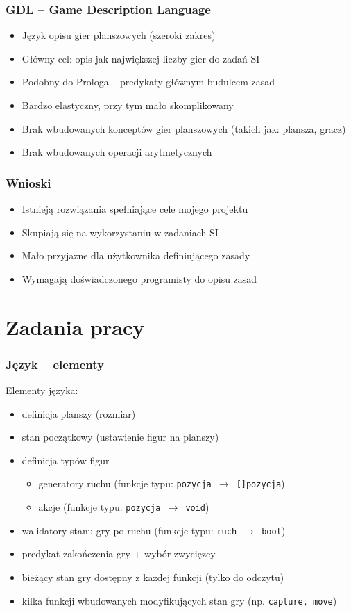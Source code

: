 \documentclass{beamer}
\begin{document}
\begin{frame}
	\frametitle{GDL -- Game Description Language\cite{GDL}}
	\begin{itemize}
		\item Język opisu gier planszowych (szeroki zakres)
		\item Główny cel: opis jak największej liczby gier do zadań SI
		\item Podobny do Prologa -- predykaty głównym budulcem zasad
		\item Bardzo elastyczny, przy tym mało skomplikowany
		\item Brak wbudowanych konceptów gier planszowych (takich jak: plansza, gracz)
		\item Brak wbudowanych operacji arytmetycznych
	\end{itemize}
\end{frame}

\begin{frame}
	\frametitle{Wnioski}
	\begin{itemize}
		\item Istnieją rozwiązania spełniające cele mojego projektu
		\item Skupiają się na wykorzystaniu w zadaniach SI
		\item Mało przyjazne dla użytkownika definiującego zasady
		\item Wymagają doświadczonego programisty do opisu zasad
	\end{itemize}
\end{frame}

\section{Zadania pracy}

\begin{frame}
	\frametitle{Język -- elementy}
	Elementy języka:
	\begin{itemize}
		\item definicja planszy (rozmiar)
		\item stan początkowy (ustawienie figur na planszy)
		\item definicja typów figur
		      \begin{itemize}
			      \item generatory ruchu (funkcje typu: {\tt pozycja $\rightarrow$ []pozycja})
			      \item akcje (funkcje typu: {\tt pozycja $\rightarrow$ void})
		      \end{itemize}
		\item walidatory stanu gry po ruchu (funkcje typu: {\tt ruch $\rightarrow$ bool})
		\item predykat zakończenia gry + wybór zwycięzcy
		\item bieżący stan gry dostępny z każdej funkcji (tylko do odczytu)
		\item kilka funkcji wbudowanych modyfikujących stan gry (np. {\tt capture, move})
	\end{itemize}
\end{frame}
\end{document}
